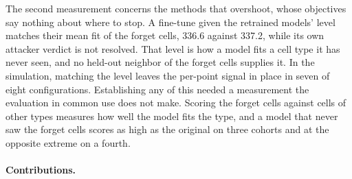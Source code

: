 \documentclass{article}
\begin{document}
The second measurement concerns the methods that overshoot, whose objectives say nothing about where to stop. A fine-tune given the retrained models' level matches their mean fit of the forget cells, 336.6 against 337.2, while its own attacker verdict is not resolved. That level is how a model fits a cell type it has never seen, and no held-out neighbor of the forget cells supplies it. In the simulation, matching the level leaves the per-point signal in place in seven of eight configurations. Establishing any of this needed a measurement the evaluation in common use does not make. Scoring the forget cells against cells of other types measures how well the model fits the type, and a model that never saw the forget cells scores as high as the original on three cohorts and at the opposite extreme on a fourth.

\paragraph{Contributions.}
\end{document}

